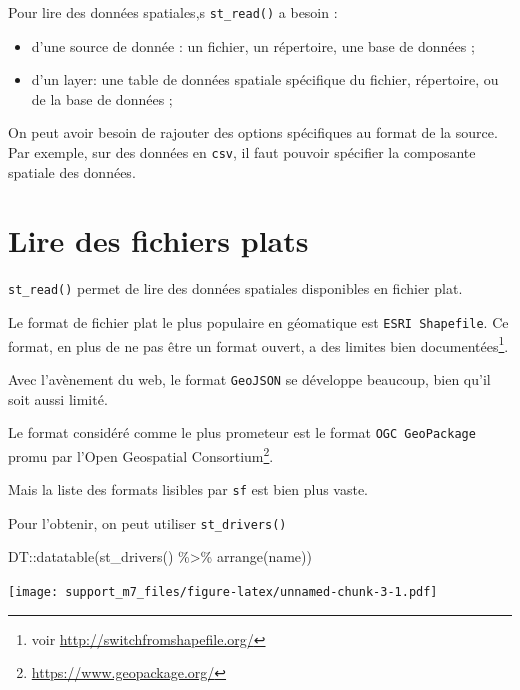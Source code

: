 \documentclass[
]{book}
\newenvironment{Shaded}{\begin{snugshade}}{\end{snugshade}}
\newcommand{\FunctionTok}[1]{\textcolor[rgb]{0.00,0.00,0.00}{#1}}
\newcommand{\NormalTok}[1]{#1}
\newcommand{\SpecialCharTok}[1]{\textcolor[rgb]{0.00,0.00,0.00}{#1}}
\providecommand{\tightlist}{%
  \setlength{\itemsep}{0pt}\setlength{\parskip}{0pt}}
\begin{document}
Pour lire des données spatiales,s \texttt{st\_read()} a besoin :

\begin{itemize}
\tightlist
\item
  d'une source de donnée : un fichier, un répertoire, une base de données ;
\item
  d'un layer: une table de données spatiale spécifique du fichier, répertoire, ou de la base de données ;
\end{itemize}

On peut avoir besoin de rajouter des options spécifiques au format de la source. Par exemple, sur des données en \texttt{csv}, il faut pouvoir spécifier la composante spatiale des données.

\hypertarget{lire-des-fichiers-plats}{%
\section{Lire des fichiers plats}\label{lire-des-fichiers-plats}}

\texttt{st\_read()} permet de lire des données spatiales disponibles en fichier plat.

Le format de fichier plat le plus populaire en géomatique est \texttt{ESRI\ Shapefile}. Ce format, en plus de ne pas être un format ouvert, a des limites bien documentées\footnote{voir \url{http://switchfromshapefile.org/}}.

Avec l'avènement du web, le format \texttt{GeoJSON} se développe beaucoup, bien qu'il soit aussi limité.

Le format considéré comme le plus prometeur est le format \texttt{OGC\ GeoPackage} promu par l'Open Geospatial Consortium\footnote{\url{https://www.geopackage.org/}}.

Mais la liste des formats lisibles par \texttt{sf} est bien plus vaste.

Pour l'obtenir, on peut utiliser \texttt{st\_drivers()}

\begin{Shaded}
\begin{Highlighting}[]
\NormalTok{DT}\SpecialCharTok{::}\FunctionTok{datatable}\NormalTok{(}\FunctionTok{st\_drivers}\NormalTok{() }\SpecialCharTok{\%\textgreater{}\%} \FunctionTok{arrange}\NormalTok{(name))}
\end{Highlighting}
\end{Shaded}

\texttt{[image: support\_m7\_files/figure-latex/unnamed-chunk-3-1.pdf]}
\end{document}
